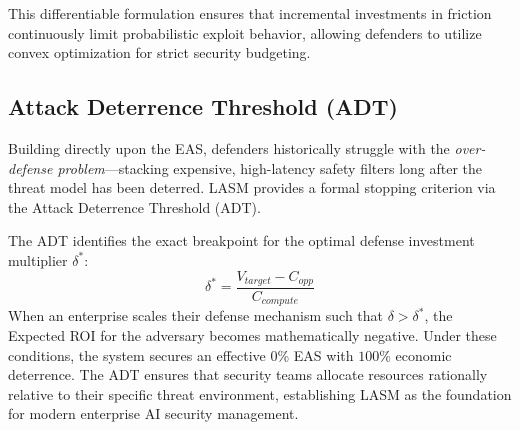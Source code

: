 This differentiable formulation ensures that incremental investments in friction continuously limit probabilistic exploit behavior, allowing defenders to utilize convex optimization for strict security budgeting.

\subsection{Attack Deterrence Threshold (ADT)}
\label{subsec:adt}

Building directly upon the EAS, defenders historically struggle with the \textit{over-defense problem}—stacking expensive, high-latency safety filters long after the threat model has been deterred. LASM provides a formal stopping criterion via the Attack Deterrence Threshold (ADT).

The ADT identifies the exact breakpoint for the optimal defense investment multiplier $\delta^*$:
\begin{equation}
    \delta^* = \frac{V_{target} - C_{opp}}{C_{compute}}
\end{equation}
When an enterprise scales their defense mechanism such that $\delta > \delta^*$, the Expected ROI for the adversary becomes mathematically negative. Under these conditions, the system secures an effective 0\% EAS with $100\%$ economic deterrence. The ADT ensures that security teams allocate resources rationally relative to their specific threat environment, establishing LASM as the foundation for modern enterprise AI security management.
